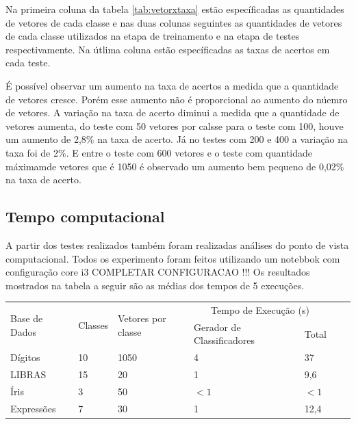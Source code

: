 Na primeira coluna da tabela \ref{tab:vetorxtaxa} estão específicadas as quantidades de vetores de cada classe e nas duas colunas seguintes as quantidades de vetores de cada classe utilizados na etapa de treinamento e na etapa de testes respectivamente. Na útlima coluna estão específicadas as taxas de acertos em cada teste. 

É possível observar um aumento na taxa de acertos a medida que a quantidade de vetores cresce. Porém esse aumento não é proporcional ao aumento do núemro de vetores. A variação na taxa de acerto diminui a medida que a quantidade de vetores aumenta, do teste com 50 vetores por calsse para o teste com 100, houve um aumento de 2,8\% na taxa de acerto. Já no testes com 200 e 400 a variação na taxa foi de 2\%. E entre o teste com 600 vetores e o teste com quantidade máximamde vetores que é 1050 é observado um aumento bem pequeno de 0,02\% na taxa de acerto.

\subsection{Tempo computacional}
A partir dos testes realizados também foram realizadas análises do ponto de vista computacional.
Todos os experimento foram feitos utilizando um notebbok com configuração core i3 COMPLETAR CONFIGURACAO !!!
Os resultados mostrados na tabela a seguir são as médias dos tempos de 5 execuções.
\begin{table}[h!]
	\begin{tabular}{|l|l|l|l|l|l|l|}
\hline
\multirow{2}{*}{Base de Dados} & \multirow{2}{*}{Classes} & \multirow{2}{*}{Vetores por classe} & \multicolumn{2}{c|}{Tempo de Execução (s)} \\
\cline{4-5}
&&& Gerador de Classificadores & Total\\
        \hline
    	Dígitos	       &   10 	 &	1050	      &		  4	           &  37  \\ \hline
   	LIBRAS         &   15 	 &	  20	      &	          1	           &   9,6\\ \hline
    	Íris           &    3	 &        50	      &		 $<1$	           &  $<1$ \\ \hline
    	Expressões     &    7 	 &        30	      &		  1                &  12,4\\ \hline
	\end{tabular}
	\label{tab:tempocomp}
\end{table}


